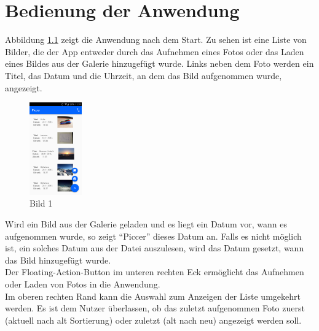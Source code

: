 
\chapter{Bedienung der Anwendung}

Abbildung \ref{Bild1} zeigt die Anwendung nach dem Start. Zu sehen ist eine Liste von Bilder, die der App entweder durch das Aufnehmen eines Fotos oder das Laden eines Bildes aus der Galerie hinzugefügt wurde. Links neben dem Foto werden ein Titel, das Datum und die Uhrzeit, an dem das Bild aufgenommen wurde, angezeigt.

\vspace*{\lineskip}
\begin{figure}
\label{Bild1}
\centering
\includegraphics[width=0.2\textwidth]{images/bild_1}
\caption{Bild 1}
\end{figure}


Wird ein Bild aus der Galerie geladen und es liegt ein Datum vor, wann es aufgenommen wurde, so zeigt \enquote{Piccer} dieses Datum an. Falls es nicht möglich ist, ein solches Datum aus der Datei auszulesen, wird das Datum gesetzt, wann das Bild hinzugefügt wurde.\\
Der Floating-Action-Button im unteren rechten Eck ermöglicht das Aufnehmen oder Laden von Fotos in die Anwendung.\\
Im oberen rechten Rand kann die Auswahl zum Anzeigen der Liste umgekehrt werden. Es ist dem Nutzer überlassen, ob das zuletzt aufgenommen Foto zuerst (aktuell nach alt Sortierung) oder zuletzt (alt nach neu) angezeigt werden soll.
